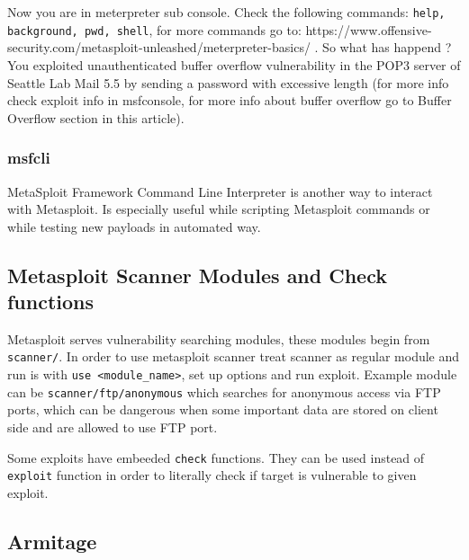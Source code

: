 \documentclass{article}[12pt]
\begin{document}
Now you are in meterpreter sub console.
Check the following commands: \texttt{help, background, pwd, shell}, for more commands go to: https://www.offensive-security.com/metasploit-unleashed/meterpreter-basics/ .
So what has happend ?
You exploited unauthenticated buffer overflow vulnerability in the POP3 server of Seattle Lab Mail 5.5 by sending a password with excessive length (for more info check exploit info in msfconsole, for more info about buffer overflow go to Buffer Overflow section in this article).

\subsubsection{msfcli}
MetaSploit Framework Command Line Interpreter is another way to interact with Metasploit.
Is especially useful while scripting Metasploit commands or while testing new payloads in automated way.


\subsection{Metasploit Scanner Modules and Check functions}

Metasploit serves vulnerability searching modules, these modules begin from \texttt{scanner/}.
In order to use metasploit scanner treat scanner as regular module and run is with \texttt{use <module\_name>}, set up options and run exploit.
Example module can be \texttt{scanner/ftp/anonymous} which searches for anonymous access via FTP ports, which can be dangerous when some important data
are stored on client side and are allowed to use FTP port.

Some exploits have embeeded \texttt{check} functions.
They can be used instead of \texttt{exploit} function in order to literally check if target is vulnerable to given exploit.


\subsection{Armitage}
\end{document}
